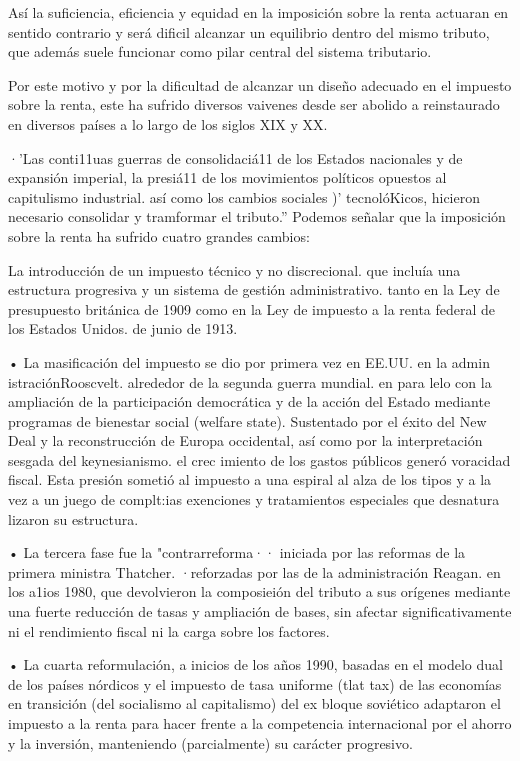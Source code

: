 \documentclass[10pt,a4paper]{article}
\begin{document}
Así la suficiencia, eficiencia y equidad en la imposición sobre la renta actuaran en sentido contrario y será dificil alcanzar un equilibrio dentro del mismo tributo, que además suele funcionar como pilar central del sistema tributario.

Por este motivo y por la dificultad de alcanzar un diseño adecuado en el impuesto sobre la renta, este ha sufrido diversos vaivenes desde ser abolido a reinstaurado en diversos países a lo largo de los siglos XIX y XX.

·'Las conti11uas guerras de consolidaciá11 de los Estados nacionales y de expansión imperial, la presiá11 de los movimientos políticos opuestos al capitulismo industrial. así como los cambios sociales )' tecnolóKicos, hicieron necesario consolidar y tramformar el tributo.'' Podemos señalar que la imposición sobre la renta ha sufrido cuatro grandes cambios:

La introducción de un impuesto técnico y no discrecional. que incluía una estructura progresiva y un sistema de gestión administrativo. tanto en la Ley de presupuesto británica de 1909 como en la Ley de impuesto a la renta federal de los Estados Unidos. de junio de 1913.

• La masificación del impuesto se dio por primera vez en EE.UU. en la admin istraciónRooscvelt. alrededor de la segunda guerra mundial. en para lelo con la ampliación de la participación democrática y de la acción del Estado mediante programas de bienestar social (welfare state). Sustentado por el éxito del New Deal y la reconstrucción de Europa occidental, así como por la interpretación sesgada del keynesianismo. el crec imiento de los gastos públicos generó voracidad fiscal. Esta presión sometió al impuesto a una espiral al alza de los tipos y a la vez a un juego de complt:ias exenciones y tratamientos especiales que desnatura lizaron su estructura.

• La tercera fase fue la "contrarreforma·· iniciada por las reformas de la primera ministra Thatcher. ·reforzadas por las de la administración Reagan. en los a1ios 1980, que devolvieron la composieión del tributo a sus orígenes mediante una fuerte reducción de tasas y ampliación de bases, sin afectar significativamente ni el rendimiento fiscal ni la carga sobre los factores.

• La cuarta reformulación, a inicios de los años 1990, basadas en el modelo dual de los países nórdicos y el impuesto de tasa uniforme (tlat tax) de las economías en transición (del socialismo al capitalismo) del ex bloque soviético adaptaron el impuesto a la renta para hacer frente a la competencia internacional por el ahorro y la inversión, manteniendo (parcialmente) su carácter progresivo.
\end{document}
